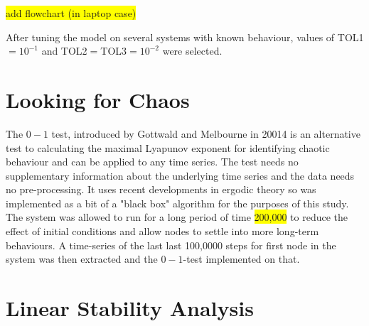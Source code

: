 \documentclass[12pt]{article}
\begin{document}
\colorbox{yellow}{add flowchart (in laptop case)}


After tuning the model on several systems with known behaviour, values of TOL1$=10^{-1}$ and TOL2$=$TOL3$=10^{-2}$ were selected.

\section{Looking for Chaos} \label{appendix:chaos}
The $0-1$ test, introduced by Gottwald and Melbourne in 20014 \cite{gottwald2004new} is an alternative test to calculating the maximal Lyapunov exponent for identifying chaotic behaviour and can be applied to any time series. The test needs no supplementary information about the underlying time series and the data needs no pre-processing. It uses recent developments in ergodic theory \cite{gottwald2004new } so was implemented as a bit of a "black box" algorithm for the purposes of this study.  The system was allowed to run for a long period of time \colorbox{yellow}{200,000} to reduce the effect of initial conditions and allow nodes to settle into more long-term behaviours. A time-series of the last last 100,0000 steps for first node in the system was then extracted and the $0-1$-test implemented on that.

\section{Linear Stability Analysis} \label{appendix:lsa}
\end{document}
